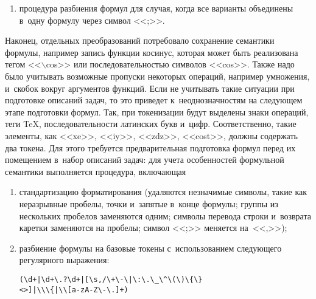 \begin{multicols}{2}
\begin{enumerate}[(1)]
{\small \begin{verbatim}
          \s[а-я]\)(?=[\s\*~]*.)
       \end{verbatim}
       }

       
       
       \vspace*{-12pt}
       
\item процедура разбиения формул для случая, когда все варианты 
объединены в~одну формулу через символ <<;>>.
\end{enumerate}

      Наконец, отдельных преобразований потребовало сохранение 
семантики формулы, например запись функции косинус, которая может 
быть реализована тегом <<$\backslash$cos>> или по\-сле\-до\-ва\-тель\-ностью символов 
<<cos>>. Также надо было учитывать воз\-мож\-ные пропуски некоторых 
операций, например умножения, и~скобок вокруг аргументов функций. Если 
не учитывать такие ситуации при подготовке описаний задач, то это 
приведет к~не\-од\-но\-знач\-ностям на сле\-ду\-ющем этапе подготовки формул. Так, при 
токенизации будут выделены знаки операций, теги \TeX, последовательности 
латинских букв и~цифр. Соответственно, такие элементы, как <<xe>>, 
<<iy>>, <<zdz>>, <<cost>>, долж\-ны содержать два токена. Для этого 
требуется предварительная подготовка формул перед их помещением в~набор 
описаний задач: для учета особенностей формульной семантики выполняется 
процедура, вклю\-ча\-ющая
      \begin{enumerate}[(1)]
\item стандартизацию форматирования (удаляются не\-зна\-чи\-мые сим\-во\-лы, 
такие как неразрывные пробелы, точ\-ки и~запятые в~конце формулы; группы 
из нескольких пробелов заменяются одним; символы перевода строки 
и~возврата каретки заменяются на пробелы; символ <<;>> меняется на~<<,>>);
\item разбиение формулы на базовые токены с~использованием сле\-ду\-юще\-го 
регулярного выражения:
{\small \begin{verbatim}
(\d+|\d+\.?\d+|[\s,/\+\-\|\:\.\_\^\(\)\{\}
<>]|\\\{|\\[a-zA-Z\-\.]+)
\end{verbatim}
}




\end{enumerate}
\end{multicols}

